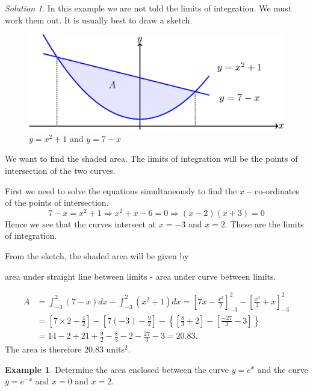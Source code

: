 \documentclass[
  11pt,
  oneside]{book}
\newcommand{\slide}{}
\theoremstyle{definition}
\theoremstyle{definition}
\newtheorem{example}{Example}[chapter]
\theoremstyle{definition}
\theoremstyle{definition}
\theoremstyle{remark}
\newtheorem*{solution}{Solution}
\begin{document}
\begin{solution}
\leavevmode

In this example we are not told the limits of integration. We must work them out. It is usually best to draw a sketch.

\begin{figure}

{\centering \includegraphics[width=0.4\linewidth]{tikztopng-figure23} 

}

\caption{$y=x^2+1$ and $y=7-x$}\label{fig:unnamed-chunk-46}
\end{figure}

We want to find the shaded area. The limits of integration will be the points of intersection of the two curves.

First we need to solve the equations simultaneously to find the \(x-\)co-ordinates of the points of intersection.
\[
7-x=x^2+1\Rightarrow x^2+x-6=0\Rightarrow (x-2)(x+3)=0
\]
Hence we see that the curves intersect at \(x=-3\) and \(x=2\). These are the limits of integration.

From the sketch, the shaded area will be given by

\begin{center}
area under straight line between limits - area under curve between limits.
\end{center}

\begin{align*}
A&=\int_{-3}^2(7-x)dx - \int_{-3}^2(x^2+1)dx = \left[7x-\frac{x^2}2\right]_{-3}^2 - \left[\frac{x^3}3+x\right]_{-3}^2\\
&=\left[7\times2-\frac{4}2\right]-\left[7(-3)-\frac92\right]-\left\{\left[\frac{8}3+2\right]-\left[\frac{-27}3-3\right]\right\}\\
&=14-2+21+\frac 92-\frac83-2-\frac{27}3-3=20.83.
\end{align*}
The area is therefore \(20.83\) units\(^2\).

\end{solution}

\slide

\begin{example}
Determine the area enclosed between the curve \(y=e^x\) and the curve \(y=e^{-x}\) and \(x=0\) and \(x=2\).
\end{example}
\end{document}

